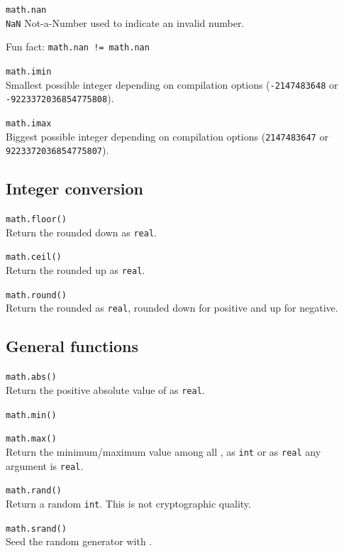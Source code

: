 \hangpar \texttt{math.nan}\\
\texttt{NaN} Not-a-Number used to indicate an invalid number.

Fun fact: \texttt{math.nan != math.nan}

\hangpar \texttt{math.imin}\\
Smallest possible integer depending on compilation options (\texttt{-2147483648} or \texttt{-9223372036854775808}).

\hangpar \texttt{math.imax}\\
Biggest possible integer depending on compilation options (\texttt{2147483647} or \texttt{9223372036854775807}).

\subsection*{Integer conversion}

\hangpar \texttt{math.floor(}\texttt{)} \\
Return the rounded down  as \texttt{real}.

\hangpar \texttt{math.ceil(}\texttt{)} \\
Return the rounded up  as \texttt{real}.

\hangpar \texttt{math.round(}\texttt{)} \\
Return the rounded  as \texttt{real}, rounded down for positive and up for negative.

\subsection*{General functions}

\hangpar \texttt{math.abs(}\texttt{)} \\
Return the positive absolute value of  as \texttt{real}.

\hangpar \texttt{math.min(}\textib{[values]*}\texttt{)}

\hangpar \texttt{math.max(}\textib{[values]*}\texttt{)} \\
Return the minimum/maximum value among all , as \texttt{int} or as \texttt{real} any argument is \texttt{real}.

\hangpar \texttt{math.rand()} \\
Return a random \texttt{int}. This is not cryptographic quality.

\hangpar \texttt{math.srand(}\texttt{)} \\
Seed the random generator with .

